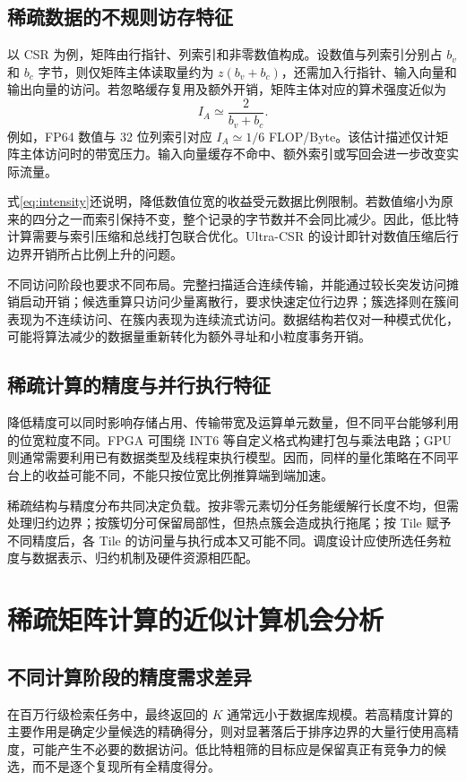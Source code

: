 \subsection{稀疏数据的不规则访存特征}
以 CSR 为例，矩阵由行指针、列索引和非零数值构成。设数值与列索引分别占 $b_v$ 和 $b_c$ 字节，则仅矩阵主体读取量约为 $z(b_v+b_c)$，还需加入行指针、输入向量和输出向量的访问。若忽略缓存复用及额外开销，矩阵主体对应的算术强度近似为
\begin{equation}
 I_A\simeq\frac{2}{b_v+b_c}.
 \label{eq:intensity}
\end{equation}
例如，FP64 数值与 32 位列索引对应 $I_A\simeq 1/6$ FLOP/Byte。该估计描述仅计矩阵主体访问时的带宽压力。输入向量缓存不命中、额外索引或写回会进一步改变实际流量。

式\eqref{eq:intensity}还说明，降低数值位宽的收益受元数据比例限制。若数值缩小为原来的四分之一而索引保持不变，整个记录的字节数并不会同比减少。因此，低比特计算需要与索引压缩和总线打包联合优化。Ultra-CSR 的设计即针对数值压缩后行边界开销所占比例上升的问题。

不同访问阶段也要求不同布局。完整扫描适合连续传输，并能通过较长突发访问摊销启动开销；候选重算只访问少量离散行，要求快速定位行边界；簇选择则在簇间表现为不连续访问、在簇内表现为连续流式访问。数据结构若仅对一种模式优化，可能将算法减少的数据量重新转化为额外寻址和小粒度事务开销。

\subsection{稀疏计算的精度与并行执行特征}
降低精度可以同时影响存储占用、传输带宽及运算单元数量，但不同平台能够利用的位宽粒度不同。FPGA 可围绕 INT6 等自定义格式构建打包与乘法电路；GPU 则通常需要利用已有数据类型及线程束执行模型。因而，同样的量化策略在不同平台上的收益可能不同，不能只按位宽比例推算端到端加速。

稀疏结构与精度分布共同决定负载。按非零元素切分任务能缓解行长度不均，但需处理归约边界；按簇切分可保留局部性，但热点簇会造成执行拖尾；按 Tile 赋予不同精度后，各 Tile 的访问量与执行成本又可能不同。调度设计应使所选任务粒度与数据表示、归约机制及硬件资源相匹配。

\section{稀疏矩阵计算的近似计算机会分析}
\subsection{不同计算阶段的精度需求差异}
在百万行级检索任务中，最终返回的 $K$ 通常远小于数据库规模。若高精度计算的主要作用是确定少量候选的精确得分，则对显著落后于排序边界的大量行使用高精度，可能产生不必要的数据访问。低比特粗筛的目标应是保留真正有竞争力的候选，而不是逐个复现所有全精度得分。

